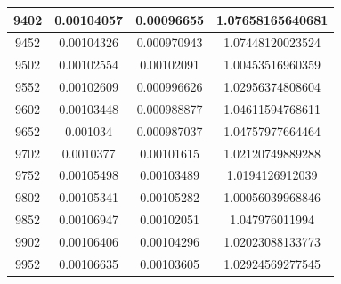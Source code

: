 \documentclass{article}
\begin{document}
\begin{longtable}{|c|c|c|c|}
		9402	&   0.00104057	  & 0.00096655	 &  1.07658165640681   \\ \hline
		9452	&   0.00104326	  & 0.000970943	 &  1.07448120023524   \\ \hline
		9502	&   0.00102554	  & 0.00102091	 &  1.00453516960359   \\ \hline
		9552	&   0.00102609	  & 0.000996626	 &  1.02956374808604   \\ \hline
		9602	&   0.00103448	  & 0.000988877	 &  1.04611594768611   \\ \hline
		9652	&   0.001034	  & 0.000987037	 &  1.04757977664464   \\ \hline
		9702	&   0.0010377	  & 0.00101615	 &  1.02120749889288   \\ \hline
		9752	&   0.00105498	  & 0.00103489	 &  1.0194126912039   \\ \hline
		9802	&   0.00105341	  & 0.00105282	 &  1.00056039968846   \\ \hline
		9852	&   0.00106947	  & 0.00102051	 &  1.047976011994   \\ \hline
		9902	&   0.00106406	  & 0.00104296	 &  1.02023088133773   \\ \hline
		9952	&   0.00106635	  & 0.00103605	 &  1.02924569277545   \\ \hline
	\end{longtable}
\end{document}
